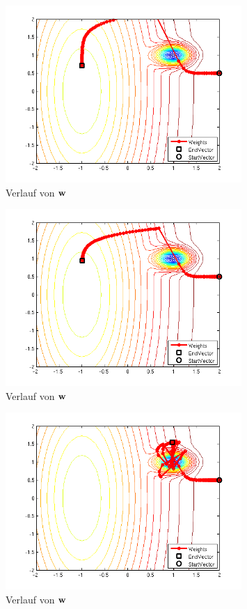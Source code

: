 \begin{figure}[h!]
  \centering
  \includegraphics[width=0.8\textwidth]{./figures/211/path_w01_eta02.png}
  \caption{Verlauf von $\mathbf{w}$}
  \label{fig:path_w01_eta02}
\end{figure}

\begin{figure}[h!]
  \centering
  \includegraphics[width=0.8\textwidth]{./figures/211/path_w01_eta015.png}
  \caption{Verlauf von $\mathbf{w}$}
  \label{fig:path_w01_eta015}
\end{figure}

\begin{figure}[h!]
  \centering
  \includegraphics[width=0.8\textwidth]{./figures/211/path_w01_eta01.png}
  \caption{Verlauf von $\mathbf{w}$}
  \label{fig:path_w01_eta01}
\end{figure}

